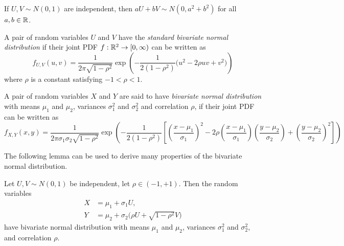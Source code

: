 \begin{corollary}\label{cor:lin_comb_std_normal}
If $U,V\sim N(0,1)$ are independent, then $aU+bV\sim N(0,a^2+b^2)$ for all $a,b\in\mathbb{R}$.
\end{corollary}
%

\begin{definition}\label{def:standard_bivariate_normal}
A pair of random variables $U$ and $V$ have the \emph{standard bivariate normal distribution} if their joint PDF $f:\mathbb{R}^2\to[0,\infty)$ can be written as
\[
f_{U,V}(u,v) = \frac{1}{2\pi\sqrt{1-\rho^2}}\exp\left(-\frac{1}{2(1-\rho^2)}\big(u^2 - 2	\rho uv + v^2\big)\right)
\]
where $\rho$ is a constant satisfying $-1 < \rho < 1$.
\end{definition}

\begin{definition}\label{def:bivariate_normal}
A pair of random variables $X$ and $Y$ are said to have \emph{bivariate normal distribution} with means $\mu_1$ and $\mu_2$, variances $\sigma_1^2$ and $\sigma_2^2$ and correlation $\rho$, if their joint PDF can be written as
\[
f_{X,Y}(x,y)
	= \frac{1}{2\pi\sigma_1\sigma_2\sqrt{1-\rho^2}}
		\exp\left(-\frac{1}{2(1-\rho^2)}\left[\left(\frac{x-\mu_1}{\sigma_1}\right)^2 
			-2\rho\left(\frac{x-\mu_1}{\sigma_1}\right)\left(\frac{y-\mu_2}{\sigma_2}\right) 
				+\left(\frac{y-\mu_2}{\sigma_2}\right)^2 \right]\right)
\]
\normalsize
\end{definition}

The following lemma can be used to derive many properties of the bivariate normal distribution.
\begin{lemma}\label{lem:trick}
Let $U,V\sim N(0,1)$ be independent, let $\rho\in(-1,+1)$. Then the random variables
\begin{align*}
X & = \mu_1 + \sigma_1 U, \\
Y & = \mu_2 + \sigma_2\big(\rho U +\sqrt{1-\rho^2}V\big)
\end{align*}
have bivariate normal distribution with means $\mu_1$ and $\mu_2$, variances $\sigma_1^2$ and $\sigma_2^2$, and correlation $\rho$.
\end{lemma}

